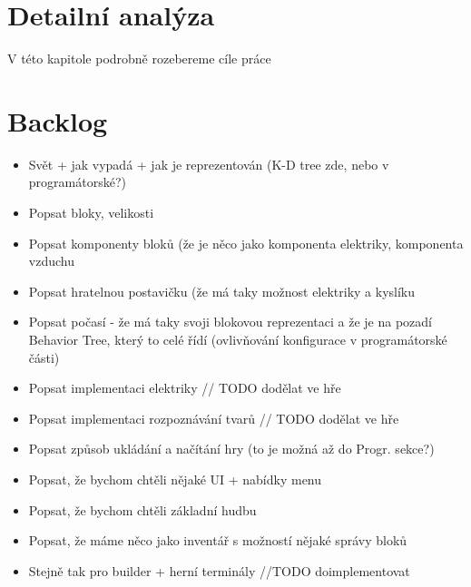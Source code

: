 
\chapter{Detailní analýza}

V této kapitole podrobně rozebereme cíle práce





















\chapter{Backlog}

\begin{itemize}
	\item Svět + jak vypadá + jak je reprezentován (K-D tree zde, nebo v programátorské?)
	\item Popsat bloky, velikosti
	\item Popsat komponenty bloků (že je něco jako komponenta elektriky, komponenta vzduchu
	\item Popsat hratelnou postavičku (že má taky možnost elektriky a kyslíku
	\item Popsat počasí - že má taky svoji blokovou reprezentaci a že je na pozadí Behavior Tree, který to celé řídí (ovlivňování konfigurace v programátorské části)
	\item Popsat implementaci elektriky // TODO dodělat ve hře
	\item Popsat implementaci rozpoznávání tvarů // TODO dodělat ve hře
	\item Popsat způsob ukládání a načítání hry (to je možná až do Progr. sekce?)
	\item Popsat, že bychom chtěli nějaké UI + nabídky menu
	\item Popsat, že bychom chtěli základní hudbu
	\item Popsat, že máme něco jako inventář s možností nějaké správy bloků
	\item Stejně tak pro builder + herní terminály  //TODO doimplementovat
\end{itemize}
